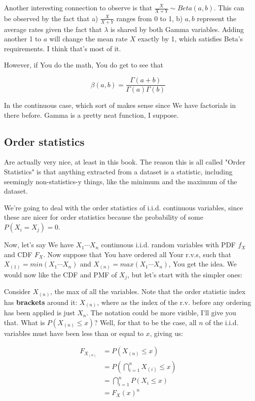 \documentclass{article}
\begin{document}
		Another interesting connection to observe is that $\frac{X}{X+Y}\sim Beta(a, b)$. This can be observed by the fact that a) $\frac{X}{X+Y}$ ranges from 0 to 1, b) $a, b$ represent the average rates given the fact that $\lambda$ is shared by both Gamma variables. Adding another 1 to $a$ will change the mean rate $X$ exactly by 1, which satisfies Beta's requirements. I think that's most of it.
		
		However, if You do the math, You do get to see that
		
		\[ \beta(a, b) = \frac{\Gamma(a+b)}{\Gamma(a)\Gamma(b)} \]
		
		In the continuous case, which sort of makes sense since We have factorials in there before. Gamma is a pretty neat function, I suppose.
		
	\subsection{Order statistics}
	
		Are actually very nice, at least in this book. The reason this is all called "Order Statistics" is that anything extracted from a dataset is a statistic, including seemingly non-statistics-y things, like the minimum and the maximum of the dataset.
		
		We're going to deal with the order statistics of i.i.d. continuous variables, since these are nicer for order statistics because the probability of some $P(X_i = X_j) = 0$.
		
		Now, let's say We have $X_1\cdots X_n$ continuous i.i.d. random variables with PDF $f_X$ and CDF $F_X$. Now suppose that You have ordered all Your r.v.s, such that $X_{(1)} = min(X_1\cdots X_n)$ and $X_{(n)} = max(X_1\cdots X_n)$, You get the idea. We would now like the CDF and PMF of $X_j$, but let's start with the simpler ones:
		
		Consider $X_{(n)}$, the max of all the variables. Note that the order statistic index has \textbf{brackets} around it: $X_{(n)}$, where as the index of the r.v. before any ordering has been applied is just $X_n$. The notation could be more visible, I'll give you that. What is $P(X_{(n)} \le x)$? Well, for that to be the case, all $n$ of the i.i.d. variables must have been less than or equal to $x$, giving us:
		
		\begin{align*}
			F_{X_{(n)}} &= P(X_{(n)}\le x)\\
			&= P\left(\bigcap^n_{i=1} X_{(i)}\le x\right)\\
			&= \bigcap^n_{i=1} P(X_{i}\le x)\\
			&= F_X(x)^n\\
		\end{align*}
		
\end{document}
